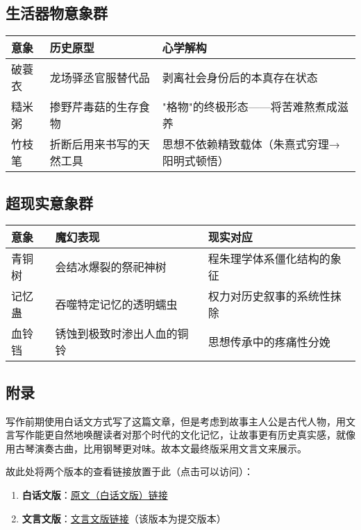 \documentclass{article}
\begin{document}
	\subsection{生活器物意象群}
	
	\begin{table}[!ht]
		\centering
		\begin{tabular}{lll}
			\hline
			意象 & 历史原型 & 心学解构  \\ \hline
			破蓑衣 & 龙场驿丞官服替代品 & 剥离社会身份后的本真存在状态  \\ 
			糙米粥 & 掺野芹毒菇的生存食物 & "格物"的终极形态——将苦难熬煮成滋养  \\ 
			竹枝笔 & 折断后用来书写的天然工具 & 思想不依赖精致载体（朱熹式穷理→阳明式顿悟） \\ \hline
		\end{tabular}
	\end{table}
	
	\subsection{超现实意象群}
	
	\begin{table}[!ht]
		\centering
		\begin{tabular}{lll}
			\hline
			意象 & 魔幻表现 & 现实对应  \\ \hline
			青铜树 & 会结冰爆裂的祭祀神树 & 程朱理学体系僵化结构的象征  \\ 
			记忆蛊 & 吞噬特定记忆的透明蠕虫 & 权力对历史叙事的系统性抹除  \\ 
			血铃铛 & 锈蚀到极致时渗出人血的铜铃 & 思想传承中的疼痛性分娩 \\ \hline
		\end{tabular}
	\end{table}
	
	\clearpage
	
	\subsection{附录}
	
	写作前期使用白话文方式写了这篇文章，但是考虑到故事主人公是古代人物，用文言写作能更自然地唤醒读者对那个时代的文化记忆，让故事更有历史真实感，就像用古琴演奏古曲，比用钢琴更对味。故本文最终版采用文言文来展示。
	
	故此处将两个版本的查看链接放置于此（点击可以访问）：
	
	\begin{enumerate}[noitemsep, label={{\arabic*})}]
		\item \textbf{白话文版}：\href{https://github.com/SoftGhostGU/In_class_related/blob/main/%E4%B8%AD%E5%9B%BD%E6%96%87%E5%8C%96%E9%80%9A%E8%AE%BA/%E3%80%8A%E9%9B%AA%E4%B8%AD%E9%93%83%E3%80%8B-%E7%99%BD%E8%AF%9D%E6%96%87%E7%89%88/%E3%80%8A%E9%9B%AA%E4%B8%AD%E9%93%83%E3%80%8B-%E5%8E%9F%E6%96%87%E7%89%88.pdf}{原文（白话文版）链接}
		\item \textbf{文言文版}：\href{https://github.com/SoftGhostGU/In_class_related/blob/main/%E4%B8%AD%E5%9B%BD%E6%96%87%E5%8C%96%E9%80%9A%E8%AE%BA/%E3%80%8A%E9%9B%AA%E4%B8%AD%E9%93%83%E3%80%8B/%E3%80%8A%E9%9B%AA%E4%B8%AD%E9%93%83%E3%80%8B.pdf}{文言文版链接}（该版本为提交版本）
	\end{enumerate}\textbf{}
	
\end{document}
